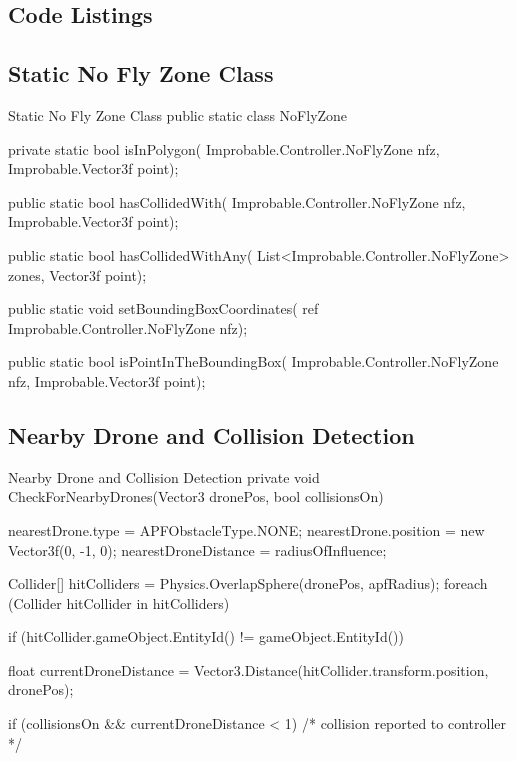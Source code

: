 \documentclass[a4paper,11pt,titlepage]{report}
\begin{document}
\newpage
{}

\printbibliography

\begin{appendices}
\chapter{Code Listings}
\section{Static No Fly Zone Class}
\begin{sexylisting}[colback=white]{Static No Fly Zone Class}
public static class NoFlyZone
{
    private static bool isInPolygon(
      Improbable.Controller.NoFlyZone nfz,
      Improbable.Vector3f point);

    public static bool hasCollidedWith(
      Improbable.Controller.NoFlyZone nfz,
      Improbable.Vector3f point);

    public static bool hasCollidedWithAny(
      List<Improbable.Controller.NoFlyZone> zones,
      Vector3f point);

    public static void setBoundingBoxCoordinates(
      ref Improbable.Controller.NoFlyZone nfz);

    public static bool isPointInTheBoundingBox(
      Improbable.Controller.NoFlyZone nfz,
      Improbable.Vector3f point);
}
\end{sexylisting}

\section{Nearby Drone and Collision Detection}
\begin{sexylisting}[colback=white]{Nearby Drone and Collision Detection}
private void CheckForNearbyDrones(Vector3 dronePos, bool collisionsOn)
{
  nearestDrone.type = APFObstacleType.NONE;
  nearestDrone.position = new Vector3f(0, -1, 0);
  nearestDroneDistance = radiusOfInfluence;

  Collider[] hitColliders = Physics.OverlapSphere(dronePos, apfRadius);
  foreach (Collider hitCollider in hitColliders)
  {
    if (hitCollider.gameObject.EntityId() != gameObject.EntityId())
    {
      float currentDroneDistance
        = Vector3.Distance(hitCollider.transform.position, dronePos);

      if (collisionsOn && currentDroneDistance < 1)
      {
        /* collision reported to controller */
      }

}}}
\end{sexylisting}
\end{appendices}
\end{document}
